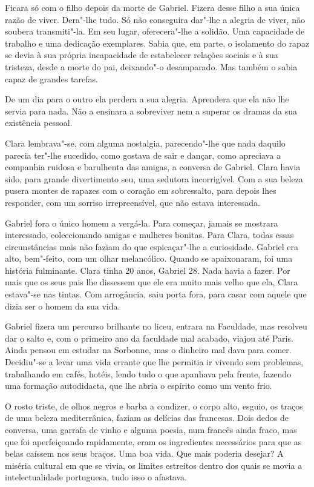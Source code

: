 Ficara só com o filho depois da morte de Gabriel. Fizera desse filho a
sua única razão de viver. Dera"-lhe tudo. Só não conseguira dar"-lhe a
alegria de viver, não soubera transmiti"-la. Em seu lugar, oferecera"-lhe
a solidão. Uma capacidade de trabalho e uma dedicação exemplares. Sabia
que, em parte, o isolamento do rapaz se devia à sua própria incapacidade
de estabelecer relações sociais e à sua tristeza, desde a morte do pai,
deixando"-o desamparado. Mas também o sabia capaz de grandes tarefas.

De um dia para o outro ela perdera a sua alegria. Aprendera que ela não
lhe servia para nada. Não a ensinara a sobreviver nem a superar os
dramas da sua existência pessoal.

Clara lembrava"-se, com alguma nostalgia, parecendo"-lhe que nada daquilo
parecia ter"-lhe sucedido, como gostava de sair e dançar, como apreciava
a companhia ruidosa e barulhenta das amigas, a conversa de Gabriel.
Clara havia sido, para grande divertimento seu, uma sedutora
incorrigível. Com a sua beleza pusera montes de rapazes com o coração em
sobressalto, para depois lhes responder, com um sorriso irrepreensível,
que não estava interessada.

Gabriel fora o único homem a vergá-la. Para começar, jamais se mostrara
interessado, coleccionando amigas e mulheres bonitas. Para Clara, todas
essas circunstâncias mais não faziam do que espicaçar"-lhe a curiosidade.
Gabriel era alto, bem"-feito, com um olhar melancólico. Quando se
apaixonaram, foi uma história fulminante. Clara tinha 20 anos, Gabriel
28. Nada havia a fazer. Por mais que os seus pais lhe dissessem que ele
era muito mais velho que ela, Clara estava"-se nas tintas. Com
arrogância, saiu porta fora, para casar com aquele que dizia ser o homem
da sua vida.

Gabriel fizera um percurso brilhante no liceu, entrara na Faculdade, mas
resolveu dar o salto e, com o primeiro ano da faculdade mal acabado,
viajou até Paris. Ainda pensou em estudar na Sorbonne, mas o dinheiro
mal dava para comer. Decidiu"-se a levar uma vida errante que lhe
permitia ir vivendo sem problemas, trabalhando em cafés, hotéis, lendo
tudo o que apanhava pela frente, fazendo uma formação autodidacta, que
lhe abria o espírito como um vento frio.

O rosto triste, de olhos negros e barba a condizer, o corpo alto,
esguio, os traços de uma beleza mediterrânica, faziam as delícias das
francesas. Dois dedos de conversa, uma garrafa de vinho e alguma poesia,
num francês ainda fraco, mas que foi aperfeiçoando rapidamente, eram os
ingredientes necessários para que as belas caíssem nos seus braços. Uma
boa vida. Que mais poderia desejar? A miséria cultural em que se vivia,
os limites estreitos dentro dos quais se movia a intelectualidade
portuguesa, tudo isso o afastava.

